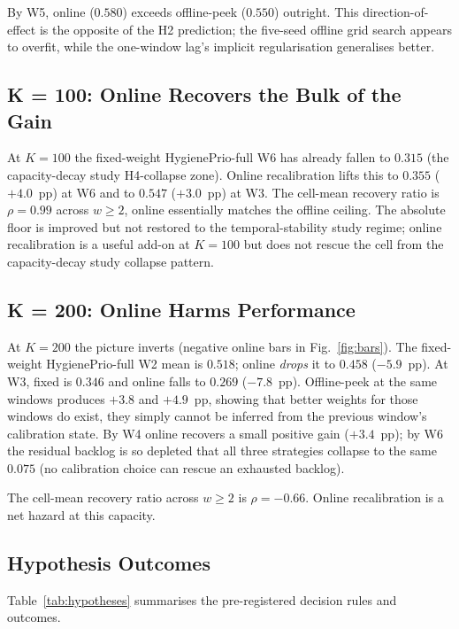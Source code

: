 By W5, online ($0.580$) exceeds offline-peek ($0.550$) outright.
This direction-of-effect is the opposite of the H2 prediction; the
five-seed offline grid search appears to overfit, while the
one-window lag's implicit regularisation generalises better.

\subsection{K = 100: Online Recovers the Bulk of the Gain}

At $K = 100$ the fixed-weight HygienePrio-full W6 has already fallen
to $0.315$ (the capacity-decay study H4-collapse zone). Online recalibration lifts
this to $0.355$ ($+4.0$~pp) at W6 and to $0.547$ ($+3.0$~pp) at W3.
The cell-mean recovery ratio is $\rho = 0.99$ across $w \geq 2$, 
online essentially matches the offline ceiling. The absolute floor
is improved but not restored to the temporal-stability study regime; online
recalibration is a useful add-on at $K = 100$ but does not rescue
the cell from the capacity-decay study collapse pattern.

\subsection{K = 200: Online Harms Performance}

At $K = 200$ the picture inverts (negative online bars in
Fig.~\ref{fig:bars}). The fixed-weight HygienePrio-full
W2 mean is $0.518$; online \textit{drops} it to $0.458$ ($-5.9$~pp).
At W3, fixed is $0.346$ and online falls to $0.269$ ($-7.8$~pp).
Offline-peek at the same windows produces $+3.8$ and $+4.9$~pp,
showing that better weights for those windows do exist, they
simply cannot be inferred from the previous window's calibration
state. By W4 online recovers a small positive gain ($+3.4$~pp); by
W6 the residual backlog is so depleted that all three strategies
collapse to the same $0.075$ (no calibration choice can rescue an
exhausted backlog).

The cell-mean recovery ratio across $w \geq 2$ is $\rho = -0.66$.
Online recalibration is a net hazard at this capacity.

\subsection{Hypothesis Outcomes}

Table~\ref{tab:hypotheses} summarises the pre-registered decision
rules and outcomes.

